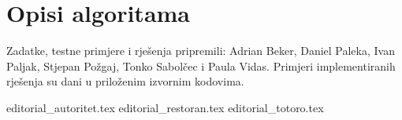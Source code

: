\documentclass[a4paper]{article}
\date{July 30th 2020.}
\begin{document}
\section*{Opisi algoritama}
Zadatke, testne primjere i rješenja pripremili: Adrian Beker,
Daniel Paleka, Ivan Paljak, Stjepan Požgaj, Tonko Sabolčec i Paula Vidas.
Primjeri implementiranih rješenja su dani u priloženim izvornim kodovima.

{editorial_autoritet.tex}
\clearpage
{editorial_restoran.tex}
\clearpage
{editorial_totoro.tex}
\clearpage
\end{document}
